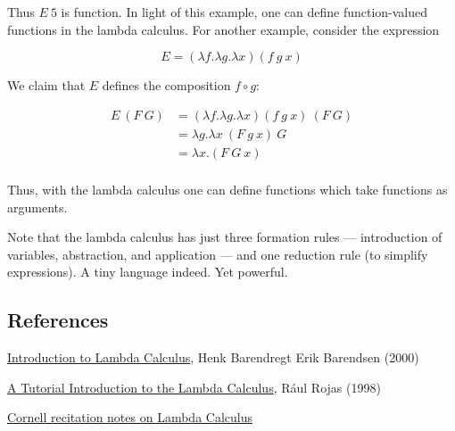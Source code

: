 Thus $E\ 5$ is function.  In light of this example, one can define function-valued functions in the lambda calculus.  For another example, consider the expression 

$$
E = (\lambda f . \lambda g . \lambda x)(f\ g\ x)
$$

We claim that $E$ defines the composition $f\circ g$:

\begin{align}
E\ (F\ G) &= (\lambda f . \lambda g . \lambda x)(f\ g\ x)\ (F\ G) \\
&= \lambda g . \lambda x\ (F\ g\ x)\ G \\
&= \lambda x . (F\ G\ x) \\
\end{align}

Thus, with the lambda calculus one can define functions which take functions as arguments.  

Note that the lambda calculus has just three formation rules — introduction of variables, abstraction, and application — and one reduction rule (to simplify expressions). A tiny language indeed.  Yet powerful.

\subsection{References}

\href{http://www.cse.chalmers.se/research/group/logic/TypesSS05/Extra/geuvers.pdf}{Introduction to Lambda Calculus}, Henk Barendregt Erik Barendsen (2000)

\href{https://www.inf.fu-berlin.de/lehre/WS03/alpi/lambda.pdf}{A Tutorial Introduction to the Lambda Calculus}, Rául Rojas (1998)

\href{http://www.cs.cornell.edu/courses/cs312/2008sp/recitations/rec26.html}{Cornell recitation notes on Lambda Calculus}